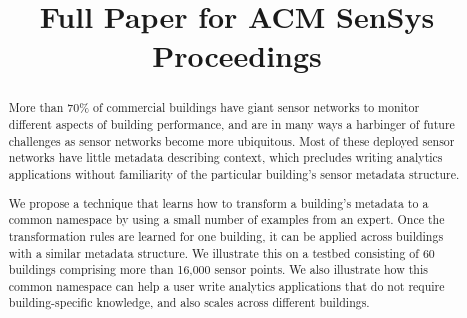 \documentclass[10pt,preprint]{sensys-proc}
\author{
%
}
\title{Full Paper for ACM SenSys Proceedings}
\begin{document}
\maketitle

\begin{abstract}
More than 70\% of commercial buildings have giant sensor networks to monitor 
different aspects of building performance, and are in many ways a harbinger of future challenges as sensor networks
become more ubiquitous. Most of these deployed sensor networks 
have little metadata describing context, which precludes writing analytics applications 
without familiarity of the particular building's sensor metadata structure. 

We propose a technique that learns how to transform a building's 
metadata to a common namespace by using a small number of examples from an expert. Once 
the transformation rules are learned for one building, it can be applied across buildings 
with a similar metadata structure. We illustrate this on a testbed consisting of 
60 buildings comprising more than 16,000 sensor points. We also illustrate how this 
common namespace can help a user write analytics applications that do not require
building-specific knowledge, and also scales across different buildings.
\end{abstract}







%

%




\end{document}
